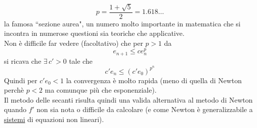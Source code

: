 \documentclass[12pt]{article}
\begin{document}
\[ p=\frac{1+\sqrt{5}}{2}=1.618\dotso\]
la famosa ``sezione aurea", un numero molto importante in matematica che si incontra in numerose questioni sia teoriche che applicative.\\
Non è difficile far vedere (facoltativo) che per $p>1$ da 
\[ e_{n+1}\leq ce_n^{p} \]
si ricava che $\exists\, c'>0$ tale che
\[ c'e_n\leq(c'e_0)^{p^n} \]
Quindi per $c'e_0<1$ la convergenza è molto rapida (meno di quella di Newton perchè $p<2$ ma comunque più che esponenziale).\\Il metodo delle secanti risulta quindi una valida alternativa al metodo di Newton quando $f'$ non sia nota o difficile da calcolare (e come Newton è generalizzabile a \uline{sistemi} di equazioni non lineari).
\end{document}
